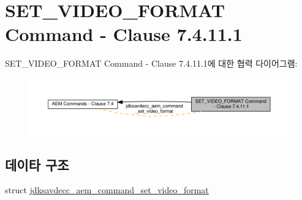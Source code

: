 \hypertarget{group__command__set__video__format}{}\section{S\+E\+T\+\_\+\+V\+I\+D\+E\+O\+\_\+\+F\+O\+R\+M\+AT Command -\/ Clause 7.4.11.1}
\label{group__command__set__video__format}
S\+E\+T\+\_\+\+V\+I\+D\+E\+O\+\_\+\+F\+O\+R\+M\+AT Command -\/ Clause 7.4.11.1에 대한 협력 다이어그램\+:
\nopagebreak
\begin{figure}[H]
\begin{center}
\leavevmode
\includegraphics[width=350pt]{group__command__set__video__format}
\end{center}
\end{figure}
\subsection*{데이타 구조}
\begin{DoxyCompactItemize}
\item 
struct \hyperlink{structjdksavdecc__aem__command__set__video__format}{jdksavdecc\+\_\+aem\+\_\+command\+\_\+set\+\_\+video\+\_\+format}
\end{DoxyCompactItemize}
